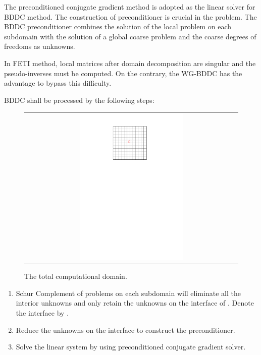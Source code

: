 The preconditioned conjugate gradient method is adopted as the linear solver for BDDC method. The construction of preconditioner is crucial in the problem. The BDDC preconditioner combines the solution of the local problem on each subdomain with the solution of a global coarse problem and the coarse degrees of freedoms as unknowns. 

In FETI method, local matrices after domain decomposition are singular and the pseudo-inverses must be computed. On the contrary, the WG-BDDC has the advantage to bypass this difficulty.

BDDC shall be processed by the following steps:

\begin{figure}[h]
	\centering
	\begin{tabular}{c}
		\includegraphics[width=0.5\textwidth]{./pics/domain.pdf}
	\end{tabular}
	\caption{\footnotesize The total computational domain.}\label{fig3: domain}
\end{figure}

\begin{enumerate}
	\item	Schur Complement \cite{duff1986direct} of problems on each subdomain  will eliminate all the interior unknowns and only retain the unknowns on the interface of . Denote the interface by .
	\item	Reduce the unknowns on the interface to construct the preconditioner.
	\item	Solve the linear system by using preconditioned conjugate gradient solver.
\end{enumerate}


